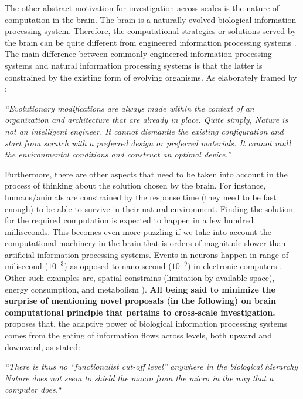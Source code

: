 The other abstract motivation for investigation across scales is the nature of computation in the brain.
The brain is a naturally evolved biological information processing system.
Therefore, the computational strategies or solutions served by the brain can be quite different from engineered information processing systems \cite[Chapter 1]{churchlandComputationalBrain1992}\cite{douglasRecurrentNeuronalCircuits2007}.
The main difference between commonly engineered information processing systems and natural information processing systems is that the latter is constrained by the existing form of evolving organisms.
As elaborately framed by \citet[Chapter 1]{churchlandComputationalBrain1992}:
\begin{displayquote}\textsl{
    ``Evolutionary modifications are
    always made within the context of an organization and architecture that are
    already in place. Quite simply, Nature is not an intelligent engineer. It cannot
    dismantle the existing configuration and start from scratch with a preferred
    design or preferred materials.
    It cannot mull the environmental conditions and construct an optimal device.''
  }
\end{displayquote}
Furthermore, there are other aspects that need to be taken into account in the process of thinking about the solution chosen by the brain.
For instance,
humans/animals are constrained by the response time (they need to be fast enough) to be able to survive in their natural environment.
Finding the solution for the required computation is expected to happen in a few hundred milliseconds.
This becomes even more puzzling if we take into account the computational machinery in the brain that is orders of magnitude slower than artificial information processing systems.
Events in neurons happen in range of milisecond ($10^{-3}$)
as opposed to  nano second ($10^{-9}$) in electronic computers \cite{douglasRecurrentNeuronalCircuits2007}.
Other such examples are, spatial constrains (limitation by available space), energy consumption, and metabolism
\cite[Chapter 1]{churchlandComputationalBrain1992}).
\textbf{All being said to minimize the surprise of mentioning novel proposals (in the following) on brain computational principle that pertains to cross-scale investigation.}
\citet{bellLevelsLoopsFuture1999,bellCrossLevelTheory2007} proposes that, 
the adaptive power of biological information processing systems comes from
the gating of information flows across levels, both upward and downward,
as \citet{bellCrossLevelTheory2007} stated:
\begin{displayquote}\textsl{
    ``There is thus no ``functionalist cut-off level'' anywhere in the biological hierarchy
    Nature does not seem to shield the macro from the micro in the way that a
    computer does.``
  }
\end{displayquote}
